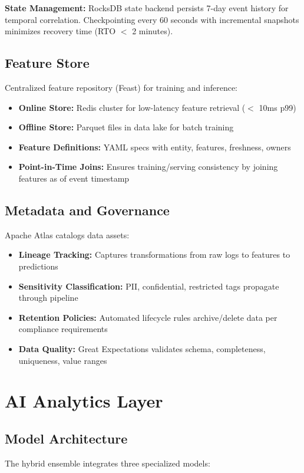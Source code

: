 \textbf{State Management:}
RocksDB state backend persists 7-day event history for temporal correlation. Checkpointing every 60 seconds with incremental snapshots minimizes recovery time (RTO $<$ 2 minutes).

\subsection{Feature Store}
Centralized feature repository (Feast) for training and inference:
\begin{itemize}
    \item \textbf{Online Store:} Redis cluster for low-latency feature retrieval ($<$ 10ms p99)
    \item \textbf{Offline Store:} Parquet files in data lake for batch training
    \item \textbf{Feature Definitions:} YAML specs with entity, features, freshness, owners
    \item \textbf{Point-in-Time Joins:} Ensures training/serving consistency by joining features as of event timestamp
\end{itemize}

\subsection{Metadata and Governance}
Apache Atlas catalogs data assets:
\begin{itemize}
    \item \textbf{Lineage Tracking:} Captures transformations from raw logs to features to predictions
    \item \textbf{Sensitivity Classification:} PII, confidential, restricted tags propagate through pipeline
    \item \textbf{Retention Policies:} Automated lifecycle rules archive/delete data per compliance requirements
    \item \textbf{Data Quality:} Great Expectations validates schema, completeness, uniqueness, value ranges
\end{itemize}

\section{AI Analytics Layer}\label{sec:arch-aianalytics}
\subsection{Model Architecture}
The hybrid ensemble integrates three specialized models:

